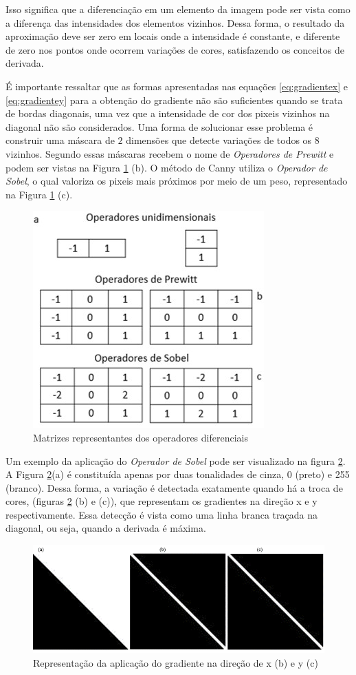 \documentclass[a4paper,alpha-refs]{RBCA_v1.0}
\begin{document}
Isso significa que a diferenciação em um elemento da imagem pode ser vista como a diferença das intensidades dos elementos vizinhos. Dessa forma, o resultado da aproximação deve ser zero em locais onde a intensidade é constante,  e diferente de zero nos pontos onde ocorrem variações de cores, satisfazendo os conceitos de derivada.

É importante ressaltar que as formas apresentadas nas equações \ref{eq:gradientex} e \ref{eq:gradientey} para a obtenção do gradiente não são suficientes quando se trata de bordas diagonais, uma vez que a intensidade de cor dos pixeis vizinhos na diagonal não são considerados. Uma forma de solucionar esse problema é construir uma máscara de $2$ dimensões que detecte variações de todos os 8 vizinhos. Segundo \cite{ProcDigital} essas máscaras recebem o nome de \textit{Operadores de Prewitt} e podem ser vistas na Figura \ref{img:mascara} (b). O método de Canny utiliza o \textit{Operador de Sobel}, o qual valoriza os pixeis mais próximos por meio de um peso, representado na Figura \ref{img:mascara} (c).

\begin{figure}[h!]
	\centering
	\includegraphics[width=.3\textwidth]{img/mascara.jpg}
	\caption{Matrizes representantes dos operadores diferenciais}
	\label{img:mascara}
\end{figure}

Um exemplo da aplicação do \textit{Operador de Sobel} pode ser visualizado na figura \ref{img:gradiente}. A Figura \ref{img:gradiente}(a) é constituída apenas por duas tonalidades de cinza, 0 (preto) e 255 (branco). Dessa forma, a variação é detectada exatamente quando há a troca de cores, (figuras \ref{img:gradiente} (b) e (c)), que representam os gradientes na direção x e y respectivamente. Essa detecção é vista como uma linha branca traçada na diagonal, ou seja, quando a derivada é máxima.

\begin{figure}[h!]
	\centering
	\includegraphics[width=.35\textwidth]{img/gradiente.png}
	\caption{Representação da aplicação do gradiente na direção de x (b) e y (c)}
	\label{img:gradiente}
\end{figure}
\end{document}
